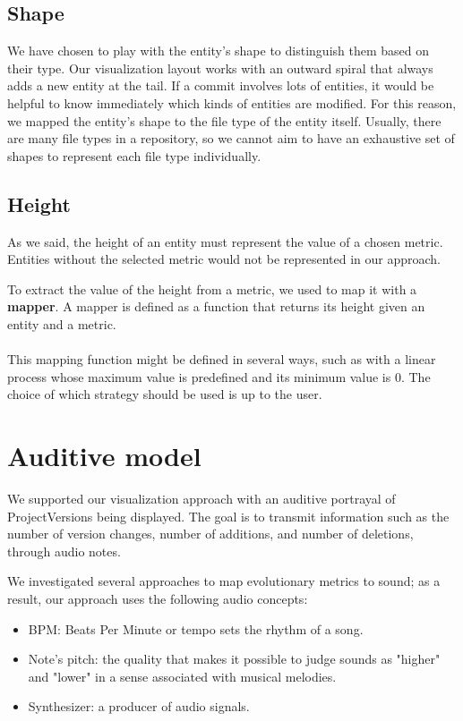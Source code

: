 \subsection*{Shape}
We have chosen to play with the entity's shape to distinguish them based on their type. 
Our visualization layout works with an outward spiral that always adds a new entity at the tail. 
If a commit involves lots of entities, it would be helpful to know immediately which kinds of entities are modified. 
For this reason, we mapped the entity's shape to the file type of the entity itself.
Usually, there are many file types in a repository, so we cannot aim to have an exhaustive set of shapes to represent each file type individually. 

\subsection*{Height}
As we said, the height of an entity must represent the value of a chosen metric. 
Entities without the selected metric would not be represented in our approach. 

To extract the value of the height from a metric, we used to map it with a \textbf{mapper}.
A mapper is defined as a function that returns its height given an entity and a metric.\\
\\
This mapping function might be defined in several ways, such as with a linear process whose maximum value is predefined and its minimum value is 0. 
The choice of which strategy should be used is up to the user. 



\section{Auditive model}

We supported our visualization approach with an auditive portrayal of ProjectVersions being displayed. The goal is to transmit information such as the number of version changes, number of additions, and number of deletions, through audio notes. 

We investigated several approaches to map evolutionary metrics to sound; as a result, our approach uses the following audio concepts:
\begin{itemize}
	\item BPM: Beats Per Minute or tempo sets the rhythm of a song. 
	\item Note's pitch: the quality that makes it possible to judge sounds as "higher" and "lower" in a sense associated with musical melodies.
	\item Synthesizer: a producer of audio signals. 
\end{itemize}

